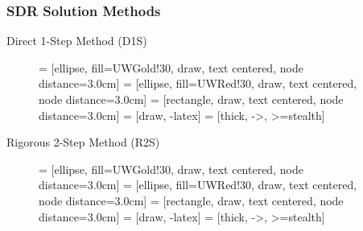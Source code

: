 \documentclass{beamer}
\begin{document}
\begin{frame}
\frametitle{SDR Solution Methods}

\begin{minipage}{0.47\textwidth}
\begin{block}{Direct 1-Step Method (D1S)}
	\vspace{1cm}
	\begin{figure}
        \centering

         = [ellipse, fill=UWGold!30, draw, text centered,
		node distance=3.0cm]
         = [ellipse, fill=UWRed!30, draw, text centered, node
		distance=3.0cm]
         = [rectangle, draw, text centered, node distance=3.0cm]
         = [draw, -latex]
         = [thick, ->, >=stealth]
        
        \end{figure}
\end{block}
\end{minipage}
\hfill
\begin{minipage}{0.47\textwidth}
\begin{block}{Rigorous 2-Step Method (R2S)}
	\vspace{1cm}
	\begin{figure}
        \centering

         = [ellipse, fill=UWGold!30, draw, text centered,
		node distance=3.0cm]
         = [ellipse, fill=UWRed!30, draw, text centered, node
		distance=3.0cm]
         = [rectangle, draw, text centered, node distance=3.0cm]
         = [draw, -latex]
         = [thick, ->, >=stealth]
        

\end{figure}
\end{block}
\end{minipage}
\end{frame}
\end{document}
